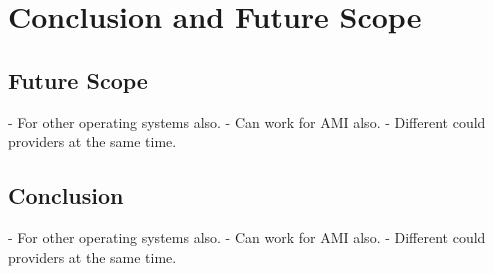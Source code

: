 \chapter{Conclusion and Future Scope}


\section{Future Scope}
-  For other operating systems also.
-	Can work for AMI also.
-	Different could providers at the same time.




\section{Conclusion}

-  For other operating systems also.
-	Can work for AMI also.
-	Different could providers at the same time.
